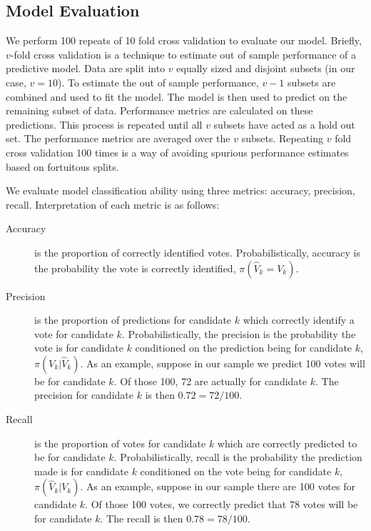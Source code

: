 \documentclass[
]{article}
\begin{document}
\hypertarget{model-evaluation}{%
\subsection{Model Evaluation}\label{model-evaluation}}

We perform 100 repeats of 10 fold cross validation to evaluate our
model. Briefly, \(v\)-fold cross validation is a technique to estimate
out of sample performance of a predictive model. Data are split into
\(v\) equally sized and disjoint subsets (in our case, \(v=10\)). To
estimate the out of sample performance, \(v-1\) subsets are combined and
used to fit the model. The model is then used to predict on the
remaining subset of data. Performance metrics are calculated on these
predictions. This process is repeated until all \(v\) subsets have acted
as a hold out set. The performance metrics are averaged over the \(v\)
subsets. Repeating \(v\) fold cross validation 100 times is a way of
avoiding spurious performance estimates based on fortuitous splits.

We evaluate model classification ability using three metrics: accuracy,
precision, recall. Interpretation of each metric is as follows:

\begin{description}
\item[Accuracy] is the proportion of correctly identified votes.  Probabilistically, accuracy is the probability the vote is correctly identified, $\pi(\widehat{V}_k = V_k)$.

\item[Precision] is the proportion of predictions for candidate $k$ which correctly identify a vote for candidate $k$.  Probabilistically, the precision is the probability the vote is for candidate $k$ conditioned on the prediction being for candidate $k$, $\pi(V_k \vert \widehat{V}_k)$.  As an example, suppose in our sample we predict 100 votes will be for candidate $k$.  Of those 100, 72 are actually for candidate $k$.  The precision for candidate $k$ is then $0.72 = 72/100$.

\item[Recall] is the proportion of votes for candidate $k$ which are correctly predicted to be for candidate $k$.  Probabilistically, recall is the probability the prediction made is for candidate $k$ conditioned on the vote being for candidate $k$, $\pi(\widehat{V}_k \vert V_k)$.  As an example, suppose in our sample there are 100 votes for candidate $k$.  Of those 100 votes, we correctly predict that 78 votes will be for candidate $k$.  The recall is then $0.78=78/100$.        
\end{description}
\end{document}
